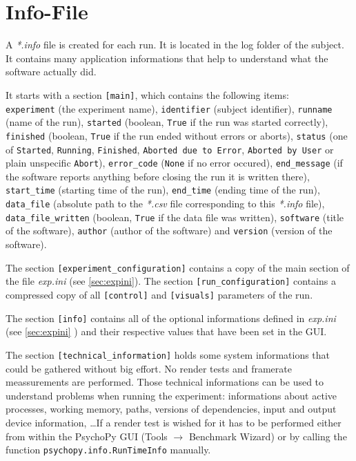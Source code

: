 \documentclass[12pt,a4paper]{book}
\begin{document}
\section{Info-File}

A \textit{*.info} file is created for each run. It is located in the log folder of the subject. It contains many application informations that help to understand what the software actually did.

It starts with a section \verb|[main]|, which contains the following items: \\
\verb|experiment| (the experiment name), \verb|identifier| (subject identifier), \verb|runname| (name of the run), \verb|started| (boolean, \verb|True| if the run was started correctly), \verb|finished| (boolean, \verb|True| if the run ended without errors or aborts), \verb|status| (one of \verb|Started|, \verb|Running|, \verb|Finished|, \verb|Aborted due to Error|, \verb|Aborted by User| or plain unspecific \verb|Abort|), \verb|error_code| (\verb|None| if no error occured), \verb|end_message| (if the software reports anything before closing the run it is written there), \verb|start_time| (starting time of the run), \verb|end_time| (ending time of the run), \verb|data_file| (absolute path to the \textit{*.csv} file corresponding to this \textit{*.info} file), \verb|data_file_written| (boolean, \verb|True| if the data file was written), \verb|software| (title of the software), \verb|author| (author of the software) and \verb|version| (version of the software).

The section \verb|[experiment_configuration]| contains a copy of the main section of the file \textit{exp.ini} (see \ref{sec:expini}). The section \verb|[run_configuration]| contains a compressed copy of all \verb|[control]| and \verb|[visuals]| parameters of the run.

The section \verb|[info]| contains all of the optional informations defined in \textit{exp.ini} (see \ref{sec:expini} ) and their respective values that have been set in the GUI.

The section \verb|[technical_information]| holds some system informations that could be gathered without big effort. No render tests and framerate meassurements are performed. Those technical informations can be used to understand problems when running the experiment: informations about active processes, working memory, paths, versions of dependencies, input and output device information, \dots If a render test is wished for it has to be performed either from within the PsychoPy GUI (Tools $\rightarrow$ Benchmark Wizard) or by calling the function \verb|psychopy.info.RunTimeInfo| manually.
\end{document}
